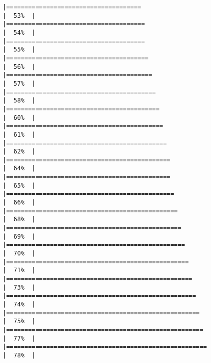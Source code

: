 \documentclass[
]{article}
\begin{document}
\begin{verbatim}
|=====================================                                 |  53%  |                                                                              |======================================                                |  54%  |                                                                              |======================================                                |  55%  |                                                                              |=======================================                               |  56%  |                                                                              |========================================                              |  57%  |                                                                              |=========================================                             |  58%  |                                                                              |==========================================                            |  60%  |                                                                              |===========================================                           |  61%  |                                                                              |============================================                          |  62%  |                                                                              |=============================================                         |  64%  |                                                                              |=============================================                         |  65%  |                                                                              |==============================================                        |  66%  |                                                                              |===============================================                       |  68%  |                                                                              |================================================                      |  69%  |                                                                              |=================================================                     |  70%  |                                                                              |==================================================                    |  71%  |                                                                              |===================================================                   |  73%  |                                                                              |====================================================                  |  74%  |                                                                              |=====================================================                 |  75%  |                                                                              |======================================================                |  77%  |                                                                              |=======================================================               |  78%  |                                                                              
\end{verbatim}
\end{document}
